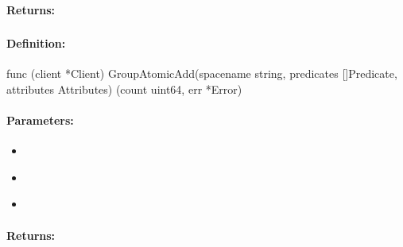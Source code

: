 \paragraph{Returns:}


\pagebreak
\subsubsection{}
\label{api:Go:GroupAtomicAdd}


\paragraph{Definition:}
\begin{gocode}
func (client *Client) GroupAtomicAdd(spacename string, predicates []Predicate, attributes Attributes) (count uint64, err *Error)
\end{gocode}

\paragraph{Parameters:}
\begin{itemize}[noitemsep]
\item {}\\

\item {}\\

\item {}\\

\end{itemize}

\paragraph{Returns:}


\pagebreak
\subsubsection{}
\label{api:Go:AtomicSub}


